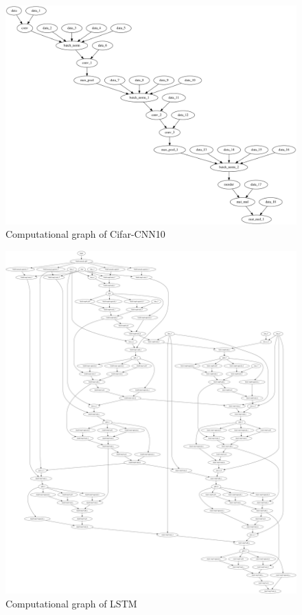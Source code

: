 \begin{figure}[th]
\centering
\includegraphics[scale=0.3]{Figures/cnn_smv_dataflow_graph.png}
\decoRule
\caption[cnn]{Computational graph of Cifar-CNN10}
\label{fig:comp_graph_cnn}
\end{figure}

\begin{figure}[th]
\centering
\includegraphics[scale=0.1]{Figures/lstm_dataflow.png}
\decoRule
\caption[lstm]{Computational graph of LSTM}
\label{fig:comp_graph_lstm}
\end{figure}


